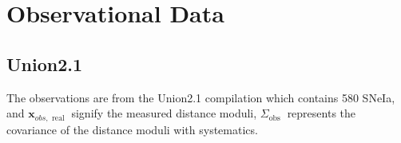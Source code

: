 \section{Observational Data}
\subsection{Union2.1}
The observations are from the Union2.1 compilation \cite{suzuki2012hubble} which contains 580 SNeIa, and $\boldsymbol{x}_{o b s, \text { real }}$ signify the measured distance moduli, $\Sigma_{\text {obs }}$ represents the covariance of the distance moduli with systematics.